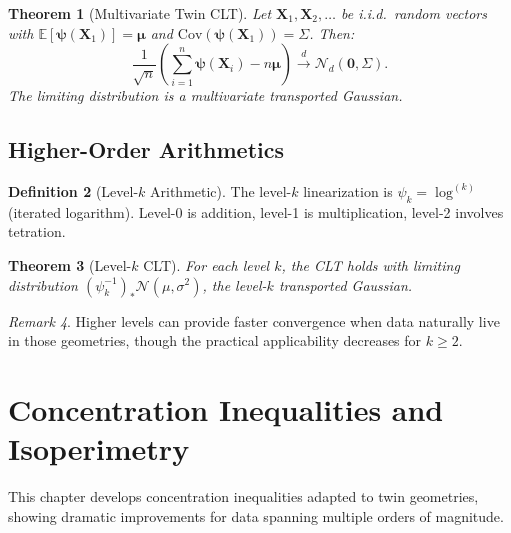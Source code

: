 \documentclass[11pt,twoside,openright]{book}
\theoremstyle{plain}
\newtheorem{theorem}{Theorem}[chapter]
\theoremstyle{definition}
\newtheorem{definition}[theorem]{Definition}
\theoremstyle{remark}
\newtheorem{remark}[theorem]{Remark}
\newcommand{\calN}{\mathcal{N}}
\newcommand{\E}{\mathbb{E}}
\newcommand{\Cov}{\mathrm{Cov}}
\begin{document}
\begin{theorem}[Multivariate Twin CLT]
\label{thm:multivariate-twin-clt}
Let $\mathbf{X}_1, \mathbf{X}_2, \ldots$ be i.i.d.\ random vectors with $\E[\boldsymbol{\psi}(\mathbf{X}_1)] = \boldsymbol{\mu}$ and $\Cov(\boldsymbol{\psi}(\mathbf{X}_1)) = \Sigma$. Then:
\begin{equation}
\frac{1}{\sqrt{n}}\left(\sum_{i=1}^n \boldsymbol{\psi}(\mathbf{X}_i) - n\boldsymbol{\mu}\right) \xrightarrow{d} \calN_d(\mathbf{0}, \Sigma).
\label{eq:multivariate-twin-clt}
\end{equation}
The limiting distribution is a multivariate transported Gaussian.
\end{theorem}

\section{Higher-Order Arithmetics}

\begin{definition}[Level-$k$ Arithmetic]
The level-$k$ linearization is $\psi_k = \log^{(k)}$ (iterated logarithm). Level-0 is addition, level-1 is multiplication, level-2 involves tetration.
\end{definition}

\begin{theorem}[Level-$k$ CLT]
\label{thm:level-k-clt}
For each level $k$, the CLT holds with limiting distribution $(\psi_k^{-1})_* \calN(\mu, \sigma^2)$, the level-$k$ transported Gaussian.
\end{theorem}

\begin{remark}
Higher levels can provide faster convergence when data naturally live in those geometries, though the practical applicability decreases for $k \geq 2$.
\end{remark}


\chapter{Concentration Inequalities and Isoperimetry}
\label{ch:concentration}

This chapter develops concentration inequalities adapted to twin geometries, showing dramatic improvements for data spanning multiple orders of magnitude.
\end{document}
